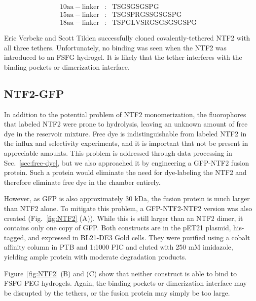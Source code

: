 \begin{align*}
\mathrm{10aa-linker}&:&\mathrm{TSGSGSGSPG}\\
\mathrm{15aa-linker}&:&\mathrm{TSGSPRGSSGSGSPG}\\
\mathrm{18aa-linker}&:&\mathrm{TSPGLVSRGSGSGSGSPG}
\end{align*}

Eric Verbeke and Scott Tilden successfully cloned covalently-tethered NTF2 with all three tethers.  Unfortunately, no binding was seen when the NTF2 was introduced to an FSFG hydrogel.  It is likely that the tether interferes with the binding pockets or dimerization interface.

\subsection{NTF2-GFP}

In addition to the potential problem of NTF2 monomerization, the fluorophores that labeled NTF2 were prone to hydrolysis, leaving an unknown amount of free dye in the reservoir mixture.  Free dye is indistinguishable from labeled NTF2 in the influx and selectivity experiments, and it is important that not be present in appreciable amounts.  This problem is addressed through data processing in Sec.~\ref{sec:free-dye}, but we also approached it by engineering a GFP-NTF2 fusion protein.  Such a protein would eliminate the need for dye-labeling the NTF2 and therefore eliminate free dye in the chamber entirely.  

However, as GFP is also approximately 30 kDa, the fusion protein is much larger than NTF2 alone.  To mitigate this problem, a GFP-NTF2-NTF2 version was also created (Fig.~\ref{fig:NTF2} (A)).  While this is still larger than an NTF2 dimer, it contains only one copy of GFP.  Both constructs are in the pET21 plasmid, his-tagged, and expressed in BL21-DE3 Gold cells.  They were purified using a cobalt affinity column in PTB and 1:1000 PIC and eluted with 250 mM imidazole, yielding ample protein with moderate degradation products.

Figure~\ref{fig:NTF2} (B) and (C) show that neither construct is able to bind to FSFG PEG hydrogels.  Again, the binding pockets or dimerization interface may be disrupted by the tethers, or the fusion protein may simply be too large.

